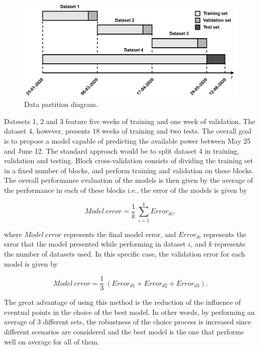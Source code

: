 \begin{figure}[h!]
    \centering
    \begin{center}
    \includegraphics[width=1\textwidth]{Images/data_partition.png}
    \caption{Data partition diagram.}
    \label{partition}
    \end{center}
\end{figure}

Datesets 1, 2 and 3 feature five weeks of training and one week of validation. The dataset 4, however, presents 18 weeks of training and two tests. The overall goal is to propose a model capable of predicting the available power between May 25 and June 12. The standard approach would be to split dataset 4 in training, validation and testing.  Block cross-validation consists of dividing the training set in a fixed number of blocks, and perform training and validation on these blocks. The overall performance evaluation of the models is then given by the average of the performance in each of these blocks i.e., the error of the models is given by

\begin{equation}
     Model\ error =\frac {1}{k}\ \sum_{i=1}^k Error_{di},
\label{err_av}
\end{equation}

where $Model\ error$ represents the final model error, and $Error_{di}$ represents the error that the model presented while performing in dataset $i$, and $k$ represents the number of datasets used.
In this specific case, the validation error for each model is given by

\begin{equation}
     Model\ error =\frac {1}{3}\ (Error_{d1} + Error_{d2} + Error_{d3}).
\label{err_av}
\end{equation}

The great advantage of using this method is the reduction of the influence of eventual points in the choice of the best model. In other words, by performing an average of 3 different sets, the robustness of the choice process is increased since different scenarios are considered and the best model is the one that performs well on average for all of them.

